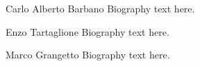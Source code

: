 \documentclass[10pt,journal,compsoc]{IEEEtran}
\begin{document}
\maketitle


\IEEEdisplaynontitleabstractindextext



\IEEEpeerreviewmaketitle








\appendices









 

























\ifCLASSOPTIONcaptionsoff
  \newpage
\fi









\begin{IEEEbiography}{Carlo Alberto Barbano}
Biography text here.
\end{IEEEbiography}

\begin{IEEEbiography}{Enzo Tartaglione}
Biography text here.
\end{IEEEbiography}


\begin{IEEEbiography}{Marco Grangetto}
Biography text here.
\end{IEEEbiography}
\end{document}
